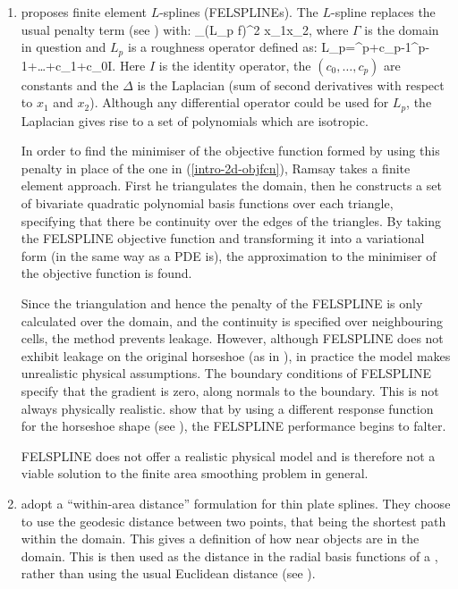 \begin{enumerate}
\item {} proposes finite element $L$-splines (FELSPLINEs). The $L$-spline replaces the usual penalty term (see ) with:
\be
\int \int_\Gamma (L_p f)^2 x_1x_2,
\ee
where $\Gamma$ is the domain in question and $L_p$ is a roughness operator defined as:
\be
L_p=\Delta^p+c_{p-1}\Delta^{p-1}+\dots+c_1\Delta+c_0I.
\ee
Here $I$ is the identity operator, the $(c_0,\dots, c_p)$ are constants and the $\Delta$ is the Laplacian (sum of second derivatives with respect to $x_1$ and $x_2$). Although any differential operator could be used for $L_p$, the Laplacian gives rise to a set of polynomials which are isotropic.

In order to find the minimiser of the objective function formed by using this penalty in place of the one in (\ref{intro-2d-objfcn}), Ramsay takes a finite element approach. First he triangulates the domain, then he constructs a set of bivariate quadratic polynomial basis functions over each triangle, specifying that there be continuity over the edges of the triangles. By taking the FELSPLINE objective function and transforming it into a variational form (in the same way as a PDE is), the approximation to the minimiser of the objective function is found. 

Since the triangulation and hence the penalty of the FELSPLINE is only calculated over the domain, and the continuity is specified over neighbouring cells, the method prevents leakage. However, although FELSPLINE does not exhibit leakage on the original horseshoe (as in ), in practice the model makes unrealistic physical assumptions. The boundary conditions of FELSPLINE specify that the gradient is zero, along normals to the boundary. This is not always physically realistic.  show that by using a different response function for the horseshoe shape (see ), the FELSPLINE performance begins to falter.

FELSPLINE does not offer a realistic physical model and is therefore not a viable solution to the finite area smoothing problem in general.

\item {} adopt a ``within-area distance'' formulation for thin plate splines. They choose to use the geodesic distance between two points, that being the shortest path within the domain. This gives a definition of how near objects are in the domain. This is then used as the distance in the radial basis functions of a \tprs, rather than using the usual Euclidean distance (see ).


\end{enumerate}
